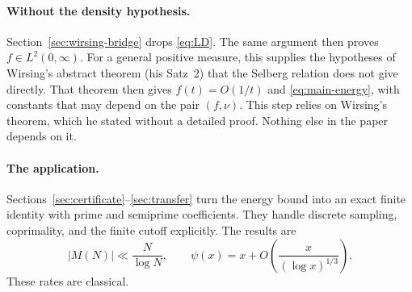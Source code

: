 \documentclass[11pt,letterpaper]{article}
\numberwithin{equation}{section}
\theoremstyle{definition}
\theoremstyle{remark}
\begin{document}
\paragraph{Without the density hypothesis.}
Section~\ref{sec:wirsing-bridge} drops \eqref{eq:LD}. The same argument then
proves $f\in L^2(0,\infty)$. For a general positive measure, this supplies
the hypotheses of Wirsing's abstract theorem (his Satz~2) that the Selberg
relation does not give directly. That theorem then gives $f(t)=O(1/t)$ and
\eqref{eq:main-energy}, with constants that may depend on the pair
$(f,\nu)$. This step relies on Wirsing's theorem, which he stated without a detailed proof.
Nothing else in the paper depends on it.

\paragraph{The application.}
Sections~\ref{sec:certificate}--\ref{sec:transfer} turn the energy bound
into an exact finite identity with prime and semiprime coefficients. They
handle discrete sampling, coprimality, and the finite cutoff explicitly. The
results are
\begin{equation}\label{eq:arith-conclusions}
 |M(N)|\ll\frac{N}{\log N},\qquad
 \psi(x)=x+O\!\left(\frac{x}{(\log x)^{1/3}}\right).
\end{equation}
These rates are classical.
\end{document}
